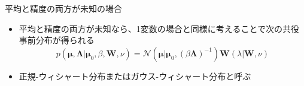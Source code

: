   \begin{frame}{平均と精度の両方が未知の場合}
   \begin{itemize}
    \item \alert{平均と精度の両方が未知}なら、1変数の場合と同様に考えることで次の共役事前分布が得られる
          \begin{equation}
           p(\bm{\mu},\bm{\Lambda}|\bm{\mu}_0,\beta,\bm{W},\nu) = \mathcal{N}(\bm{\mu}|\bm{\mu}_0,(\beta\bm{\Lambda})^{-1})\bm{W}(\lambda|\bm{W},\nu)
          \end{equation}
    \item \alert{正規-ウィシャート分布}または\alert{ガウス-ウィシャート分布}と呼ぶ
   \end{itemize}
  \end{frame}
